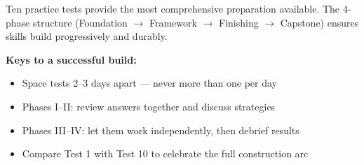 {%
\begin{tcolorbox}[
    enhanced,
    colback=funBlue!3,
    colframe=funBlue!25,
    arc=6pt, boxrule=0.8pt,
    left=5mm, right=5mm, top=4mm, bottom=4mm,
    title={\textcolor{white}{\faHeart~Project Manager's Guide (for Parents \& Guardians)}},
    colbacktitle=funBlue!55,
    fonttitle=\bfseries\sffamily,
    borderline west={3pt}{0pt}{funBlue!40},
]
    \small\color{funGrayDark}
    Ten practice tests provide the most comprehensive preparation available.
    The 4-phase structure (Foundation $\to$ Framework $\to$ Finishing $\to$ Capstone)
    ensures skills build progressively and durably.

    \medskip
    \textbf{Keys to a successful build:}
    \begin{itemize}[leftmargin=*, itemsep=1pt]
        \item Space tests 2--3 days apart --- never more than one per day
        \item Phases I--II: review answers together and discuss strategies
        \item Phases III--IV: let them work independently, then debrief results
        \item Compare Test 1 with Test 10 to celebrate the full construction arc
    \end{itemize}
\end{tcolorbox}

}

\newpage

